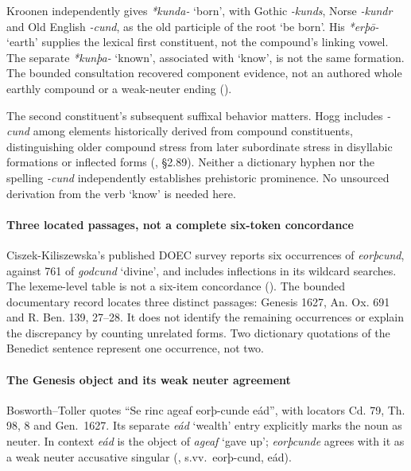 \documentclass[
  british,
  a4paper,
]{article}
\begin{document}
Kroonen independently gives \emph{*kunda-} `born', with Gothic
\emph{-kunds}, Norse \emph{-kundr} and Old English \emph{-cund}, as the
old participle of the root `be born'. His \emph{*erþō-} `earth' supplies
the lexical first constituent, not the compound's linking vowel. The
separate \emph{*kunþa-} `known', associated with `know', is not the same
formation. The bounded consultation recovered component evidence, not an
authored whole earthly compound or a weak-neuter ending
().

The second constituent's subsequent suffixal behavior matters. Hogg
includes \emph{-cund} among elements historically derived from compound
constituents, distinguishing older compound stress from later
subordinate stress in disyllabic formations or inflected forms
(, §2.89). Neither a
dictionary hyphen nor the spelling \emph{-cund} independently
establishes prehistoric prominence. No unsourced derivation from the
verb `know' is needed here.

\paragraph{Three located passages, not a complete six-token
concordance}\label{three-located-passages-not-a-complete-six-token-concordance}

Ciszek-Kiliszewska's published DOEC survey reports six occurrences of
\emph{eorþcund}, against 761 of \emph{godcund} `divine', and includes
inflections in its wildcard searches. The lexeme-level table is not a
six-item concordance
(). The bounded documentary record locates three distinct
passages: Genesis 1627, An. Ox. 691 and R. Ben. 139, 27--28. It does not
identify the remaining occurrences or explain the discrepancy by
counting unrelated forms. Two dictionary quotations of the Benedict
sentence represent one occurrence, not two.

\paragraph{The Genesis object and its weak neuter
agreement}\label{the-genesis-object-and-its-weak-neuter-agreement}

Bosworth--Toller quotes ``Se rinc ageaf eorþ-cunde eád'', with locators
Cd. 79, Th. 98, 8 and Gen.~1627. Its separate \emph{eád} `wealth' entry
explicitly marks the noun as neuter. In context \emph{eád} is the object
of \emph{ageaf} `gave up'; \emph{eorþcunde} agrees with it as a weak
neuter accusative singular (, s.vv.~eorþ-cund, eád).
\end{document}
